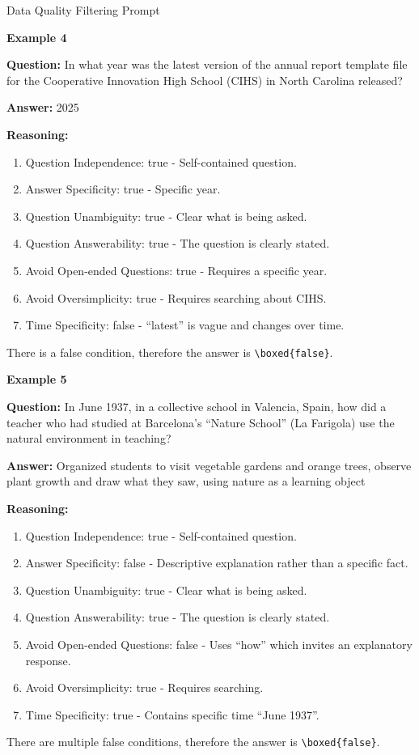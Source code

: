 \documentclass{article} %
\theoremstyle{plain}
\theoremstyle{definition}
\theoremstyle{remark}
\begin{document}
\begin{promptbox}{Data Quality Filtering Prompt}
\noindent\hrulefill

\textbf{Example 4}

\textbf{Question:} In what year was the latest version of the annual report template file for the Cooperative Innovation High School (CIHS) in North Carolina released?

\textbf{Answer:} 2025

\textbf{Reasoning:}
\begin{enumerate}[label=\arabic*.]
    \item Question Independence: true - Self-contained question.
    \item Answer Specificity: true - Specific year.
    \item Question Unambiguity: true - Clear what is being asked.
    \item Question Answerability: true - The question is clearly stated.
    \item Avoid Open-ended Questions: true - Requires a specific year.
    \item Avoid Oversimplicity: true - Requires searching about CIHS.
    \item Time Specificity: false - ``latest'' is vague and changes over time.
\end{enumerate}
There is a false condition, therefore the answer is \texttt{\textbackslash boxed\{false\}}.

\noindent\hrulefill

\textbf{Example 5}

\textbf{Question:} In June 1937, in a collective school in Valencia, Spain, how did a teacher who had studied at Barcelona's ``Nature School'' (La Farigola) use the natural environment in teaching?

\textbf{Answer:} Organized students to visit vegetable gardens and orange trees, observe plant growth and draw what they saw, using nature as a learning object

\textbf{Reasoning:}
\begin{enumerate}[label=\arabic*.]
    \item Question Independence: true - Self-contained question.
    \item Answer Specificity: false - Descriptive explanation rather than a specific fact.
    \item Question Unambiguity: true - Clear what is being asked.
    \item Question Answerability: true - The question is clearly stated.
    \item Avoid Open-ended Questions: false - Uses ``how'' which invites an explanatory response.
    \item Avoid Oversimplicity: true - Requires searching.
    \item Time Specificity: true - Contains specific time ``June 1937''.
\end{enumerate}
There are multiple false conditions, therefore the answer is \texttt{\textbackslash boxed\{false\}}.


\end{promptbox}
\end{document}
